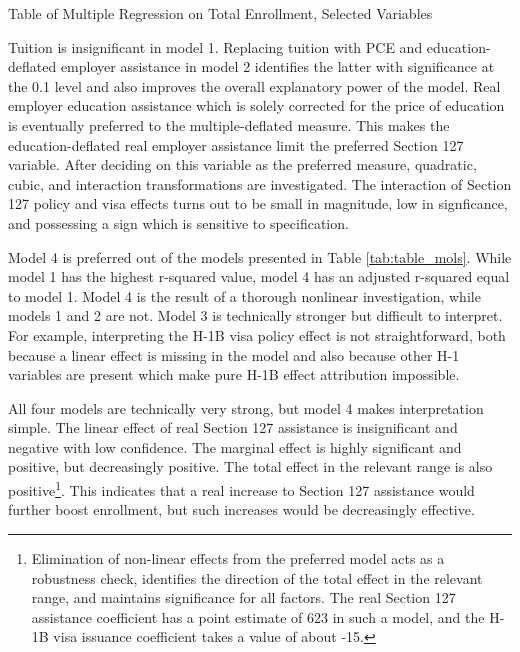 \documentclass[review]{elsarticle}
\begin{document}
\begin{table}
    \caption{Table of Multiple Regression on Total Enrollment, Selected Variables}
    \resizebox{\columnwidth}{!}{
        
    }
    \label{tab:table_mols}
\end{table}

Tuition is insignificant in model 1.
Replacing tuition with PCE and education-deflated employer assistance in model 2 identifies the latter
with significance at the 0.1 level and also improves the overall explanatory power of the model.
Real employer education assistance which is solely corrected for the price of education
is eventually preferred to the multiple-deflated measure.
This makes the education-deflated real employer assistance limit the preferred Section 127 variable.
After deciding on this variable as the preferred measure,
quadratic, cubic, and interaction transformations are investigated.
The interaction of Section 127 policy and visa effects turns out to be small in magnitude,
low in signficance,
and possessing a sign which is sensitive to specification.

Model 4 is preferred out of the models presented in Table \ref{tab:table_mols}.
While model 1 has the highest r-squared value,
model 4 has an adjusted r-squared equal to model 1.
Model 4 is the result of a thorough nonlinear investigation,
while models 1 and 2 are not.
Model 3 is technically stronger but difficult to interpret.
For example, interpreting the H-1B visa policy effect is not
straightforward, both because a linear effect is missing in the model
and also because other H-1 variables are present which make pure H-1B
effect attribution impossible.

All four models are technically very strong,
but model 4 makes interpretation simple.
The linear effect of real Section 127 assistance is insignificant and negative with low confidence.
The marginal effect is highly significant and positive, but decreasingly positive.
The total effect in the relevant range is also positive\footnote{
    Elimination of non-linear effects from the preferred model acts as a robustness check,
    identifies the direction of the total effect in the relevant range,
    and maintains significance for all factors.
    The real Section 127 assistance coefficient has a point estimate of 623 in such a model,
    and the H-1B visa issuance coefficient takes a value of about -15.
}.
This indicates that a real increase to Section 127 assistance would further boost enrollment,
but such increases would be decreasingly effective.
\end{document}
